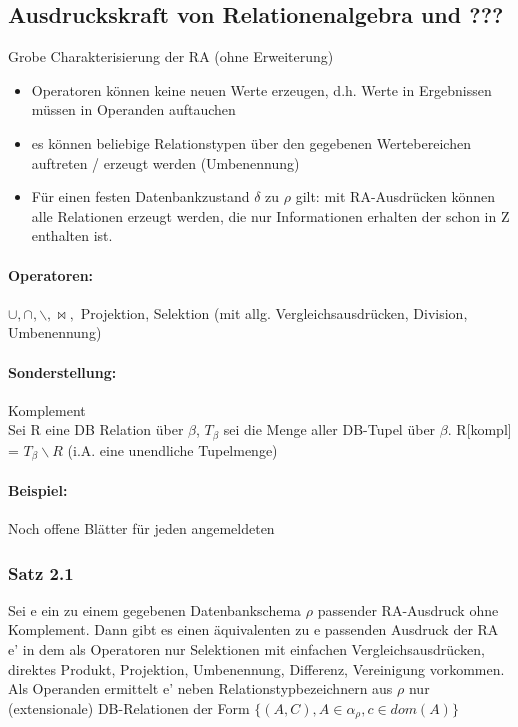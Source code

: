 \documentclass[12pt, a4paper]{article}
\begin{document}
\subsection*{Ausdruckskraft von Relationenalgebra und ???}
Grobe Charakterisierung der RA (ohne Erweiterung)
\begin{itemize}
	\item Operatoren können keine neuen Werte erzeugen, d.h. Werte in Ergebnissen müssen in Operanden auftauchen
	\item es können beliebige Relationstypen über den gegebenen Wertebereichen auftreten / erzeugt werden (Umbenennung)
	\item Für einen festen Datenbankzustand $\delta$ zu $\rho$ gilt: mit RA-Ausdrücken können alle Relationen erzeugt werden, die nur Informationen erhalten der schon in Z enthalten ist.
\end{itemize}

\paragraph{Operatoren:}  $\cup, \cap, \backslash, \bowtie,$ Projektion, Selektion (mit allg. Vergleichsausdrücken,  Division, Umbenennung)
\paragraph{Sonderstellung:} Komplement \\
Sei R eine DB Relation über $\beta$, $T_\beta$ sei die Menge aller DB-Tupel über $\beta$. R[kompl] = $T_\beta \backslash R $ (i.A. eine unendliche Tupelmenge)
\paragraph{Beispiel:} Noch offene Blätter für jeden angemeldeten

\subsubsection*{Satz 2.1}
Sei e ein zu einem gegebenen Datenbankschema $\rho$ passender RA-Ausdruck ohne Komplement. Dann gibt es einen äquivalenten zu e passenden Ausdruck der RA e' in dem als Operatoren nur Selektionen mit einfachen Vergleichsausdrücken, direktes Produkt, Projektion, Umbenennung, Differenz, Vereinigung vorkommen. Als Operanden ermittelt e' neben Relationstypbezeichnern aus $\rho$ nur (extensionale) DB-Relationen der Form $\{(A, C), A \in \alpha_\rho, c \in dom(A) \} $\\
\end{document}
